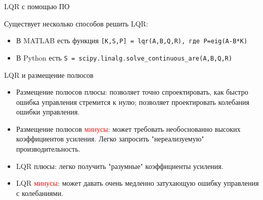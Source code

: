 \documentclass{beamer}
\begin{document}
\begin{frame}{LQR с помощью ПО}
	\begin{flushleft}
		
		Существует несколько способов решить LQR:
		
		\bigskip
		
		\begin{itemize}
			\item В MATLAB есть функция \texttt{[K,S,P] = lqr(A,B,Q,R), где P=eig(A-B*K)}
			\item В Python есть \texttt{S = scipy.linalg.solve\_continuous\_are(A,B,Q,R)}
		\end{itemize}
		
	\end{flushleft}
\end{frame}



\begin{frame}{LQR и размещение полюсов}
	\begin{flushleft}
		
		\begin{itemize}
			\item Размещение полюсов \textcolor{mydarkgreen}{плюсы}: позволяет точно спроектировать, как быстро ошибка управления стремится к нулю; позволяет проектировать колебания ошибки управления.
			
			\item Размещение полюсов \textcolor{red}{минусы}: может требовать необоснованно высоких коэффициентов усиления. Легко запросить "нереализуемую" производительность.
			
			\item LQR \textcolor{mydarkgreen}{плюсы}: легко получить "разумные" коэффициенты усиления.
			
			\item LQR \textcolor{red}{минусы}: может давать очень медленно затухающую ошибку управления с колебаниями.
		\end{itemize}
		
		
	\end{flushleft}
\end{frame}
\end{document}
